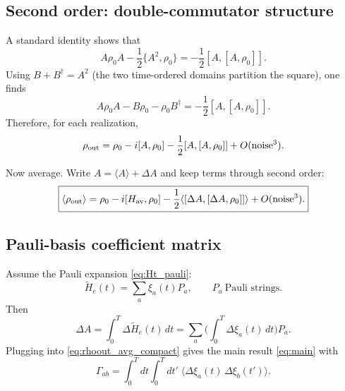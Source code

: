 \documentclass[11pt]{article}
\begin{document}
\subsection{Second order: double-commutator structure}
A standard identity shows that
\begin{equation}
A\rho_0A - \frac12\{A^2,\rho_0\} = -\frac12[A,[A,\rho_0]].
\label{eq:doublecomm_id}
\end{equation}
Using $B+B^\dagger=A^2$ (the two time-ordered domains partition the square), one finds
\begin{equation}
A\rho_0A - B\rho_0 - \rho_0B^\dagger
=
-\frac12[A,[A,\rho_0]].
\label{eq:second_compact}
\end{equation}
Therefore, for each realization,
\begin{equation}
\rho_{\rm out}
=
\rho_0 - i[A,\rho_0] - \frac12[A,[A,\rho_0]] + O(\text{noise}^3).
\label{eq:rhoout2_compact}
\end{equation}

Now average. Write $A=\langle A\rangle + \Delta A$ and keep terms through second order:
\begin{equation}
\boxed{
\langle\rho_{\rm out}\rangle
=
\rho_0
- i[H_{\rm av},\rho_0]
-\frac12\langle [\Delta A,[\Delta A,\rho_0]]\rangle
+ O(\text{noise}^3).
}
\label{eq:rhoout_avg_compact}
\end{equation}

\subsection{Pauli-basis coefficient matrix}
Assume the Pauli expansion \eqref{eq:Ht_pauli}:
\[
\widetilde H_e(t)=\sum_a \xi_a(t)P_a,\qquad P_a\ \text{Pauli strings}.
\]
Then
\begin{equation}
\Delta A = \int_0^T \Delta\widetilde H_e(t)\,dt
= \sum_a \Big(\int_0^T \Delta\xi_a(t)\,dt\Big) P_a.
\end{equation}
Plugging into \eqref{eq:rhoout_avg_compact} gives the main result \eqref{eq:main} with
\begin{equation}
\boxed{
\Gamma_{ab}
=
\int_0^T\!dt\int_0^T\!dt'\;
\Big\langle \Delta\xi_a(t)\,\Delta\xi_b(t')\Big\rangle.
}
\label{eq:Gamma}
\end{equation}
\end{document}
